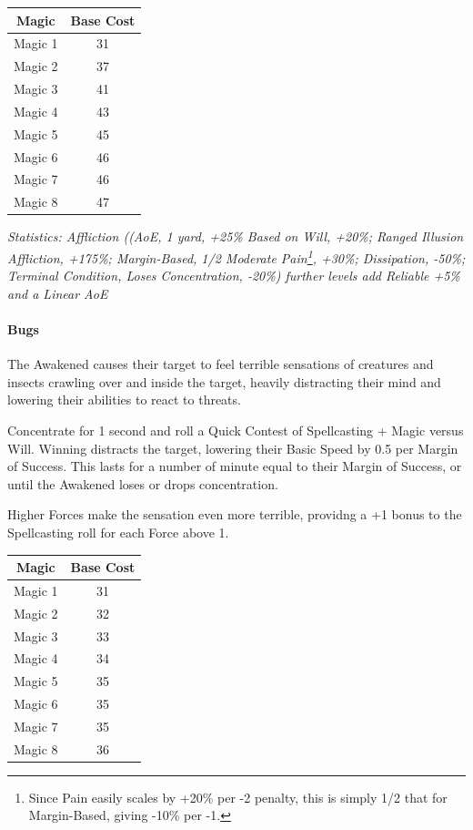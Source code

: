 \begin{multicols}{3}
		\begin{center}
		\begin{tabular}{|c|c|}
			\hline
			Magic & Base Cost \\
			\hline
			\hline
			Magic 1 & 31 \\
			Magic 2 & 37 \\
			Magic 3 & 41 \\
			Magic 4 & 43 \\
			Magic 5 & 45 \\
			Magic 6 & 46 \\
			Magic 7 & 46 \\
			Magic 8 & 47 \\
			\hline
		\end{tabular}
	\end{center}
	
	\textcolor{OliveGreen}{\textit{Statistics: Affliction ((AoE, 1 yard, +25\% Based on Will, +20\%; Ranged Illusion Affliction, +175\%; Margin-Based, 1/2 Moderate Pain\footnote{Since Pain easily scales by +20\% per -2 penalty, this is simply 1/2 that for Margin-Based, giving -10\% per -1.}, +30\%; Dissipation, -50\%; Terminal Condition, Loses Concentration, -20\%)  further levels add Reliable +5\% and a Linear AoE}}
	
	\paragraph{Bugs}
	
	The Awakened causes their target to feel terrible sensations of creatures and insects crawling over and inside the target, heavily distracting their mind and lowering their abilities to react to threats.
	
	Concentrate for 1 second and roll a Quick Contest of Spellcasting + Magic versus Will. Winning distracts the target, lowering their Basic Speed by 0.5 per Margin of Success. This lasts for a number of minute equal to their Margin of Success, or until the Awakened loses or drops concentration.
	
	Higher Forces make the sensation even more terrible, providng a +1 bonus to the Spellcasting roll for each Force above 1.
		
	\begin{center}
		\begin{tabular}{|c|c|}
			\hline
			Magic & Base Cost \\
			\hline
			\hline
			Magic 1 & 31 \\
			Magic 2 & 32 \\
			Magic 3 & 33 \\
			Magic 4 & 34 \\
			Magic 5 & 35 \\
			Magic 6 & 35 \\
			Magic 7 & 35 \\
			Magic 8 & 36 \\
			\hline
		\end{tabular}
	\end{center}
	

\end{multicols}
